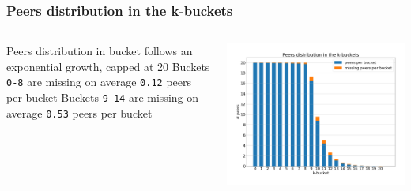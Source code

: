 \documentclass{pl-slide}
\begin{document}
\begin{frame}
\frametitle{Peers distribution in the k-buckets}

\begin{columns}[onlytextwidth]
\begin{column}{0.38\textwidth}
   	\begin{itemize}
   		\itemc Peers distribution in bucket follows an exponential growth, capped at 20
   		\itemc Buckets \texttt{0-8} are missing on average \texttt{0.12} peers per bucket
   		\itemc Buckets \texttt{9-14} are missing on average \texttt{0.53} peers per bucket
   	\end{itemize}
\end{column}
\begin{column}{0.58\textwidth}
    \begin{center}
		\includegraphics[width=\textwidth]{plots/peers-distribution-including-missing.png}
    \end{center}
\end{column}
\end{columns}
\end{frame}
\end{document}
